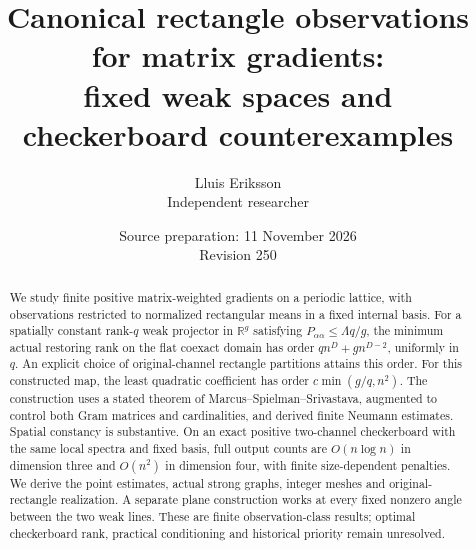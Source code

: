 \documentclass[11pt,a4paper]{article}
\title{Canonical rectangle observations for matrix gradients:\\
fixed weak spaces and checkerboard counterexamples}
\author{Lluis Eriksson\\\small Independent researcher}
\date{Source preparation: 11 November 2026\\\small Revision 250}
\theoremstyle{definition}\newtheorem{definition}[theorem]{Definition}
\theoremstyle{remark}\newtheorem{remark}[theorem]{Remark}
\newcommand{\R}{\mathbb R}
\begin{document}
\maketitle
\begin{abstract}
We study finite positive matrix-weighted gradients on a periodic lattice, with
observations restricted to normalized rectangular means in a fixed internal
basis. For a spatially constant rank-$q$ weak projector in $\R^g$ satisfying
$P_{\alpha\alpha}\leq\Lambda q/g$, the minimum actual restoring rank on the
flat coexact domain has order $q n^D+g n^{D-2}$, uniformly in $q$.
An explicit choice of original-channel rectangle partitions attains this order.
For this constructed map, the least quadratic coefficient has order
$c\min(g/q,n^2)$. The construction uses a stated theorem of
Marcus--Spielman--Srivastava, augmented to control both Gram matrices and
cardinalities, and derived finite Neumann estimates.
Spatial constancy is substantive. On an exact positive two-channel checkerboard
with the same local spectra and fixed basis, full output counts are
$O(n\log n)$ in dimension three and $O(n^2)$ in dimension four, with finite
size-dependent penalties. We derive the point estimates, actual strong graphs,
integer meshes and original-rectangle realization. A separate plane construction
works at every fixed nonzero angle between the two weak lines.
These are finite observation-class results; optimal checkerboard rank, practical
conditioning and historical priority remain unresolved.
\end{abstract}
\tableofcontents






\end{document}
